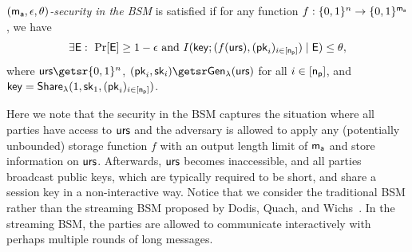 \begin{definition}
\emph{$(\mathsf{m_a},\epsilon,\theta)$-security in the BSM} is satisfied if for any function $f:\{0, 1\}^n\rightarrow\{0, 1\}^{\mathsf{m_a}}$, we have
$$\exists \event:\ \Pr[\event]\geq 1-\epsilon\ \mbox{and}\ I(\key;(f(\urs),(\pk_i)_{i\in[\pnum]})\mid\event)\leq \theta,$$
where $\urs\getsr\bin^n$, $(\pk_i,\sk_i)\getsr\Gen(\urs)$ for all $i\in{[\mathsf{n_p}]}$, and $\mathsf{key}={\mathsf{Share}}_\lambda(1,\mathsf{sk}_1,\allowbreak(\mathsf{pk}_i)_{i\in{[\mathsf{n_p}]}})$.


\end{definition}

Here we note that the security in the BSM captures the situation where
all parties have access to $\mathsf{urs}$ and the adversary is allowed to apply any (potentially unbounded) storage function $f$ with an output length limit of $\mathsf{m_a}$ and store information on $\mathsf{urs}$. Afterwards, $\mathsf{urs}$ becomes inaccessible, and all parties broadcast public keys, which are typically required to be short, and share a session key in a non-interactive way.
Notice that we consider the traditional BSM \cite{C:CacMau97} rather than the streaming BSM proposed by Dodis, Quach, and Wichs~\cite{EC:DodQuaWic23}. In the streaming BSM, the parties are allowed to communicate interactively with perhaps multiple rounds of long messages.

